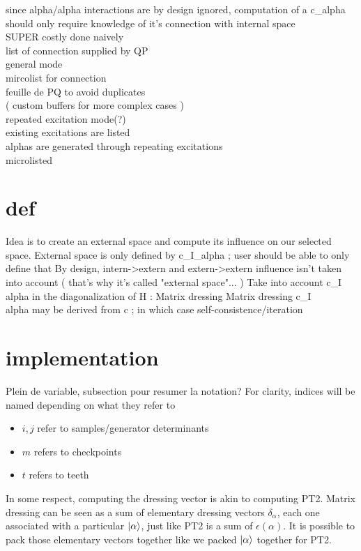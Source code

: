 \documentclass[./thesis.tex]{subfiles}
\begin{document}
since alpha/alpha interactions are by design ignored, computation of a c\_alpha should only require knowledge of it's connection with internal space \\
SUPER costly done naively \\
list of connection supplied by QP \\
general mode \\
mircolist for connection \\
feuille de PQ to avoid duplicates \\
( custom buffers for more complex cases ) \\
repeated excitation mode(?)  \\
existing excitations are listed \\
alphas are generated through repeating excitations \\

microlisted \\
\section{def}
Idea is to create an external space and compute its influence on our selected space.
External space is only defined by c\_I\_alpha ; user should be able to only define that
By design, intern->extern and extern->extern influence isn't taken into account ( that's why it's called "external space"... )
Take into account c\_I\\alpha in the diagonalization of H : Matrix dressing
Matrix dressing
c\_I\\alpha may be derived from c ; in which case self-consistence/iteration


\section{implementation}
Plein de variable, subsection pour resumer la notation?
For clarity, indices will be named depending on what they refer to
\begin{itemize}
\item
$i,j$ refer to samples/generator determinants
\item
$m$ refers to checkpoints
\item
$t$ refers to teeth
\end{itemize}

In some respect, computing the dressing vector is akin to computing PT2. Matrix dressing can be seen as a sum of elementary dressing vectors $\delta_\alpha$, each one associated with a particular $\ket \alpha$, just like PT2 is a sum of $\epsilon(\alpha)$. It is possible to pack those elementary vectors together like we packed $\ket \alpha$ together for PT2.
\end{document}
